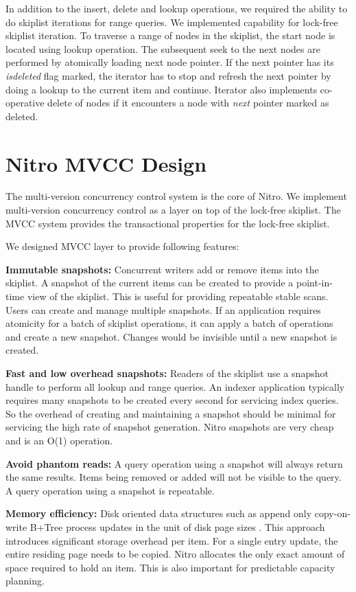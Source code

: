 \documentclass{vldb}
\begin{document}
In addition to the insert, delete and lookup operations, we required the ability to do skiplist iterations for range queries. We implemented capability for lock-free skiplist iteration. To traverse a range of nodes in the skiplist, the start node is located using lookup operation. The subsequent seek to the next nodes are performed by atomically loading next node pointer. If the next pointer has its \textit{isdeleted} flag marked, the iterator has to stop and refresh the next pointer by doing a lookup to the current item and continue. Iterator also implements co-operative delete of nodes if it encounters a node with \textit{next} pointer marked as deleted.

\section{Nitro MVCC Design}
The multi-version concurrency control system is the core of Nitro. We implement multi-version concurrency control as a layer on top of the lock-free skiplist. The MVCC system provides the transactional properties for the lock-free skiplist.

We designed MVCC layer to provide following features:

\textbf{Immutable snapshots:} Concurrent writers add or remove items into the skiplist. A snapshot of the current items can be created to provide a point-in-time view of the skiplist. This is useful for providing repeatable stable scans. Users can create and manage multiple snapshots. If an application requires atomicity for a batch of skiplist operations, it can apply a batch of operations and create a new snapshot. Changes would be invisible until a new snapshot is created.

\textbf{Fast and low overhead snapshots:} Readers of the skiplist use a snapshot handle to perform all lookup and range queries. An indexer application typically requires many snapshots to be created every second for servicing index queries. So the overhead of creating and maintaining a snapshot should be minimal for servicing the high rate of snapshot generation. Nitro snapshots are very cheap and is an O(1) operation.


\textbf{Avoid phantom reads:} A query operation using a snapshot will always return the same results. Items being removed or added will not be visible to the query. A query operation using a snapshot is repeatable.


\textbf{Memory efficiency:} Disk oriented data structures such as append only copy-on-write B+Tree process updates in the unit of disk page sizes \cite{couchdb}. This approach introduces significant storage overhead per item. For a single entry update, the entire residing page needs to be copied. Nitro allocates the only exact amount of space required to hold an item. This is also important for predictable capacity planning.
\end{document}

